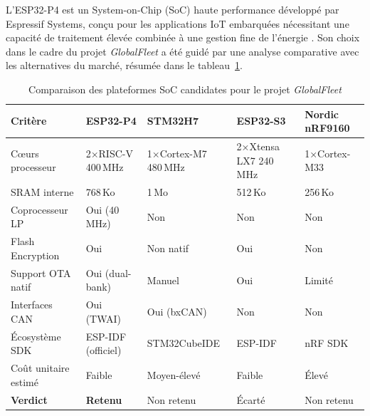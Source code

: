 L'ESP32-P4 est un System-on-Chip (SoC) haute performance développé
par Espressif Systems, conçu pour les applications IoT embarquées
nécessitant une capacité de traitement élevée combinée à une gestion
fine de l'énergie \cite{espressif_esp32p4}. Son choix dans le cadre
du projet \textit{GlobalFleet} a été guidé par une analyse comparative
avec les alternatives du marché, résumée dans le
tableau~\ref{tab:soc_comparison}.

\begin{table}[H]
\centering
\renewcommand{\arraystretch}{1.6}
\caption{Comparaison des plateformes SoC candidates pour le projet \textit{GlobalFleet}}
\label{tab:soc_comparison}
\footnotesize
\begin{tabular}{|p{3.2cm}|p{2.2cm}|p{2.2cm}|p{2.2cm}|p{2.4cm}|}
\hline
\rowcolor{gray!20}
\textbf{Critère} & \textbf{ESP32-P4} & \textbf{STM32H7} & \textbf{ESP32-S3} & \textbf{Nordic nRF9160} \\
\hline
Cœurs processeur & \mbox{2×RISC-V} 400\,MHz & 1×Cortex-M7 480\,MHz & 2×Xtensa LX7 240\,MHz & 1×Cortex-M33 \\
\hline
SRAM interne & 768\,Ko & 1\,Mo & 512\,Ko & 256\,Ko \\
\hline
Coprocesseur LP & Oui (40\,MHz) & Non & Non & Non \\
\hline
Flash Encryption & Oui & Non natif & Oui & Non \\
\hline
Support OTA natif & Oui (dual-bank) & Manuel & Oui & Limité \\
\hline
Interfaces CAN & Oui (TWAI) & Oui (bxCAN) & Non & Non \\
\hline
Écosystème SDK & ESP-IDF (officiel) & STM32CubeIDE & ESP-IDF & nRF SDK \\
\hline
Coût unitaire estimé & Faible & Moyen-élevé & Faible & Élevé \\
\hline
\rowcolor{green!15}
\textbf{Verdict} & \textbf{Retenu} & Non retenu & Écarté & Non retenu \\
\hline
\end{tabular}
\end{table}

